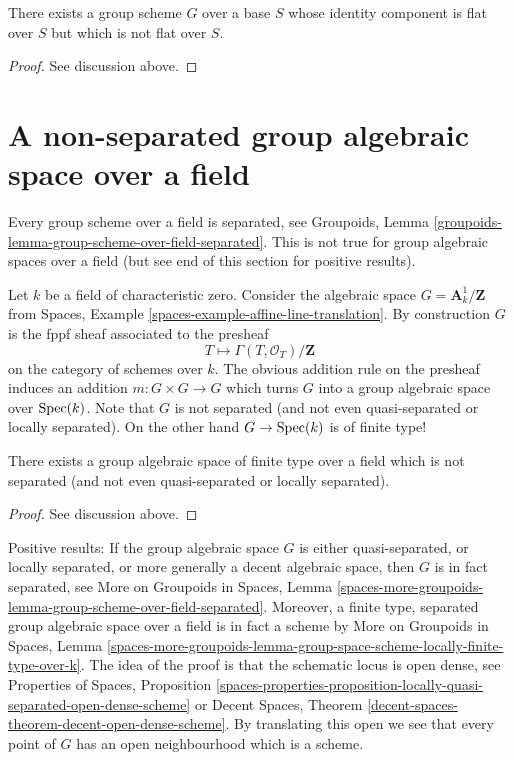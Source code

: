 \begin{lemma}
\label{lemma-non-flat-group-scheme}
There exists a group scheme $G$ over a base $S$ whose identity
component is flat over $S$ but which is not flat over $S$.
\end{lemma}

\begin{proof}
See discussion above.
\end{proof}




\section{A non-separated group algebraic space over a field}
\label{section-non-separated-group-space}

\noindent
Every group scheme over a field is separated, see
Groupoids, Lemma \ref{groupoids-lemma-group-scheme-over-field-separated}.
This is not true for group algebraic spaces over a field
(but see end of this section for positive results).

\medskip\noindent
Let $k$ be a field of characteristic zero.
Consider the algebraic space $G = \mathbf{A}^1_k/\mathbf{Z}$ from
Spaces, Example \ref{spaces-example-affine-line-translation}.
By construction $G$ is the fppf sheaf associated to the presheaf
$$
T \longmapsto \Gamma(T, \mathcal{O}_T) / \mathbf{Z}
$$
on the category of schemes over $k$. The obvious addition rule on the presheaf
induces an addition $m : G \times G \to G$ which turns $G$ into a group
algebraic space over $\mathop{\mathrm{Spec}}(k)$. Note that $G$ is not separated
(and not even quasi-separated or locally separated). On the other hand
$G \to \mathop{\mathrm{Spec}}(k)$ is of finite type!

\begin{lemma}
\label{lemma-non-separated-group-space}
There exists a group algebraic space of finite type over a field
which is not separated (and not even quasi-separated or locally separated).
\end{lemma}

\begin{proof}
See discussion above.
\end{proof}

\noindent
Positive results: If the group algebraic space $G$ is either
quasi-separated, or locally separated, or more generally a
decent algebraic space, then $G$ is in fact separated, see
More on Groupoids in Spaces, Lemma
\ref{spaces-more-groupoids-lemma-group-scheme-over-field-separated}.
Moreover, a finite type, separated group algebraic space over a
field is in fact a scheme by More on Groupoids in Spaces, Lemma
\ref{spaces-more-groupoids-lemma-group-space-scheme-locally-finite-type-over-k}.
The idea of the proof is that the schematic locus is open dense, see
Properties of Spaces, Proposition
\ref{spaces-properties-proposition-locally-quasi-separated-open-dense-scheme}
or
Decent Spaces, Theorem \ref{decent-spaces-theorem-decent-open-dense-scheme}.
By translating this open we see that
every point of $G$ has an open neighbourhood which is a scheme.




